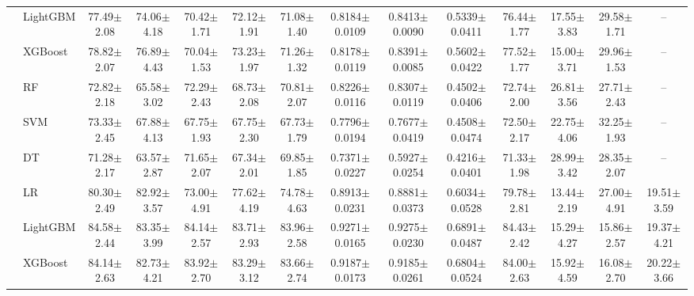 \begin{tabular}{@{}llcccccccccccc@{}}
 & LightGBM & 77.49{\tiny$\pm$2.08} & 74.06{\tiny$\pm$4.18} & 70.42{\tiny$\pm$1.71} & 72.12{\tiny$\pm$1.91} & 71.08{\tiny$\pm$1.40} & 0.8184{\tiny$\pm$0.0109} & 0.8413{\tiny$\pm$0.0090} & 0.5339{\tiny$\pm$0.0411} & 76.44{\tiny$\pm$1.77} & 17.55{\tiny$\pm$3.83} & 29.58{\tiny$\pm$1.71} & --\\
 & XGBoost & 78.82{\tiny$\pm$2.07} & 76.89{\tiny$\pm$4.43} & 70.04{\tiny$\pm$1.53} & 73.23{\tiny$\pm$1.97} & 71.26{\tiny$\pm$1.32} & 0.8178{\tiny$\pm$0.0119} & 0.8391{\tiny$\pm$0.0085} & 0.5602{\tiny$\pm$0.0422} & 77.52{\tiny$\pm$1.77} & 15.00{\tiny$\pm$3.71} & 29.96{\tiny$\pm$1.53} & --\\
 & RF & 72.82{\tiny$\pm$2.18} & 65.58{\tiny$\pm$3.02} & 72.29{\tiny$\pm$2.43} & 68.73{\tiny$\pm$2.08} & 70.81{\tiny$\pm$2.07} & 0.8226{\tiny$\pm$0.0116} & 0.8307{\tiny$\pm$0.0119} & 0.4502{\tiny$\pm$0.0406} & 72.74{\tiny$\pm$2.00} & 26.81{\tiny$\pm$3.56} & 27.71{\tiny$\pm$2.43} & --\\
 & SVM & 73.33{\tiny$\pm$2.45} & 67.88{\tiny$\pm$4.13} & 67.75{\tiny$\pm$1.93} & 67.75{\tiny$\pm$2.30} & 67.73{\tiny$\pm$1.79} & 0.7796{\tiny$\pm$0.0194} & 0.7677{\tiny$\pm$0.0419} & 0.4508{\tiny$\pm$0.0474} & 72.50{\tiny$\pm$2.17} & 22.75{\tiny$\pm$4.06} & 32.25{\tiny$\pm$1.93} & --\\
 & DT & 71.28{\tiny$\pm$2.17} & 63.57{\tiny$\pm$2.87} & 71.65{\tiny$\pm$2.07} & 67.34{\tiny$\pm$2.01} & 69.85{\tiny$\pm$1.85} & 0.7371{\tiny$\pm$0.0227} & 0.5927{\tiny$\pm$0.0254} & 0.4216{\tiny$\pm$0.0401} & 71.33{\tiny$\pm$1.98} & 28.99{\tiny$\pm$3.42} & 28.35{\tiny$\pm$2.07} & --\\
\midrule
{} & LR & 80.30{\tiny$\pm$2.49} & 82.92{\tiny$\pm$3.57} & 73.00{\tiny$\pm$4.91} & 77.62{\tiny$\pm$4.19} & 74.78{\tiny$\pm$4.63} & 0.8913{\tiny$\pm$0.0231} & 0.8881{\tiny$\pm$0.0373} & 0.6034{\tiny$\pm$0.0528} & 79.78{\tiny$\pm$2.81} & 13.44{\tiny$\pm$2.19} & 27.00{\tiny$\pm$4.91} & 19.51{\tiny$\pm$3.59}\\
 & LightGBM & 84.58{\tiny$\pm$2.44} & 83.35{\tiny$\pm$3.99} & 84.14{\tiny$\pm$2.57} & 83.71{\tiny$\pm$2.93} & 83.96{\tiny$\pm$2.58} & 0.9271{\tiny$\pm$0.0165} & 0.9275{\tiny$\pm$0.0230} & 0.6891{\tiny$\pm$0.0487} & 84.43{\tiny$\pm$2.42} & 15.29{\tiny$\pm$4.27} & 15.86{\tiny$\pm$2.57} & 19.37{\tiny$\pm$4.21}\\
 & XGBoost & 84.14{\tiny$\pm$2.63} & 82.73{\tiny$\pm$4.21} & 83.92{\tiny$\pm$2.70} & 83.29{\tiny$\pm$3.12} & 83.66{\tiny$\pm$2.74} & 0.9187{\tiny$\pm$0.0173} & 0.9185{\tiny$\pm$0.0261} & 0.6804{\tiny$\pm$0.0524} & 84.00{\tiny$\pm$2.63} & 15.92{\tiny$\pm$4.59} & 16.08{\tiny$\pm$2.70} & 20.22{\tiny$\pm$3.66}\\

\end{tabular}
